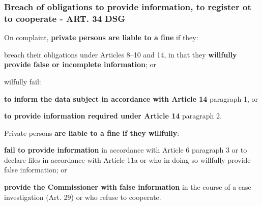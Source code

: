 \subsubsection{Breach of obligations to provide information, to register ot to cooperate - ART. 34 DSG}
\begin{compactenum}	
	\item On complaint,\textbf{ private persons are liable to a fine} if they:
	\begin{compactenum}	
		\item breach their obligations under Articles 8–10 and 14, in that they \textbf{willfully provide false or incomplete information}; or
		\item wilfully fail:
		\begin{compactenum}	
			\item \textbf{to inform the data subject in accordance with Article 14} paragraph 1, or
			\item \textbf{to provide information required under Article 14} paragraph 2.
		\end{compactenum}
	\end{compactenum}
	\item Private persons \textbf{are liable to a fine if they willfully}:
	\begin{compactenum}	
		\item \textbf{fail to provide information} in accordance with Article 6 paragraph 3 or to declare files in accordance with Article 11a or who in doing so willfully provide false information; or
		\item \textbf{provide the Commissioner with false information} in the course of a case investigation (Art. 29) or who refuse to cooperate.
	\end{compactenum}
\end{compactenum}

